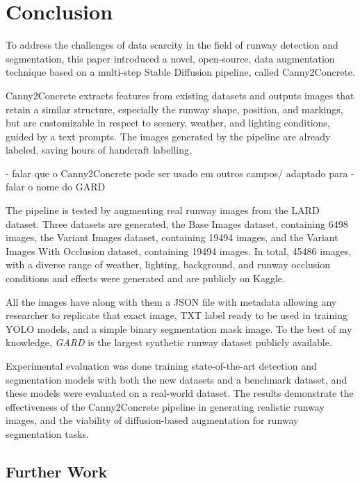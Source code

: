 \chapter{Conclusion}

To address the challenges of data scarcity in the field of runway detection and segmentation,
this paper introduced a novel, open-source, data augmentation technique based on a multi-step
Stable Diffusion pipeline, called Canny2Concrete.

Canny2Concrete extracts features from existing datasets and outputs images
that retain a similar structure, especially the runway shape, position, and markings, but are
customizable in respect to scenery, weather, and lighting conditions, guided by
a text prompts. The images generated by the pipeline are already
labeled, saving hours of handcraft labelling.

- falar que o Canny2Concrete pode ser usado em outros campos/ adaptado para
- falar o nome do GARD

The pipeline is tested by augmenting real runway images from the LARD \cite{ducoffe_lard_2023}
dataset. Three datasets are generated, the Base Images dataset,
containing 6498 images, the Variant Images dataset, containing 19494 images, and
the Variant Images With Occlusion dataset, containing 19494 images. In total,
45486 images, with a diverse range of weather, lighting, background, and runway
occlusion conditions and effects were generated and are publicly on Kaggle.

All the images have along with
them a JSON file
with metadata allowing any researcher to replicate that exact image, TXT label
ready to be used in training YOLO models, and a simple binary segmentation mask
image. To the best of my knowledge, \emph{GARD} is the largest synthetic runway
dataset publicly available.

Experimental evaluation was done training state-of-the-art detection and
segmentation models with both the new datasets and a benchmark dataset, and
these models were evaluated on a real-world dataset. The results demonstrate
the effectiveness of the Canny2Concrete pipeline in generating realistic runway
images, and the viability of diffusion-based augmentation for runway segmentation
tasks.

\section{Further Work}
